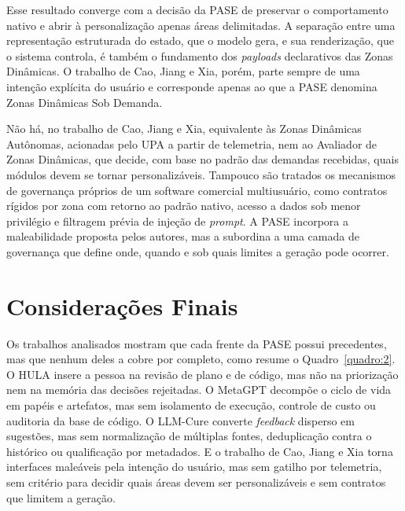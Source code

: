 Esse resultado converge com a decisão da PASE de preservar o comportamento nativo e abrir à personalização apenas áreas delimitadas. A separação entre uma representação estruturada do estado, que o modelo gera, e sua renderização, que o sistema controla, é também o fundamento dos \textit{payloads} declarativos das Zonas Dinâmicas. O trabalho de Cao, Jiang e Xia, porém, parte sempre de uma intenção explícita do usuário e corresponde apenas ao que a PASE denomina Zonas Dinâmicas Sob Demanda.

Não há, no trabalho de Cao, Jiang e Xia, equivalente às Zonas Dinâmicas Autônomas, acionadas pelo UPA a partir de telemetria, nem ao Avaliador de Zonas Dinâmicas, que decide, com base no padrão das demandas recebidas, quais módulos devem se tornar personalizáveis. Tampouco são tratados os mecanismos de governança próprios de um software comercial multiusuário, como contratos rígidos por zona com retorno ao padrão nativo, acesso a dados sob menor privilégio e filtragem prévia de injeção de \textit{prompt}. A PASE incorpora a maleabilidade proposta pelos autores, mas a subordina a uma camada de governança que define onde, quando e sob quais limites a geração pode ocorrer.

\section{Considerações Finais}\label{sec:3.6}

Os trabalhos analisados mostram que cada frente da PASE possui precedentes, mas que nenhum deles a cobre por completo, como resume o Quadro~\ref{quadro:2}. O HULA insere a pessoa na revisão de plano e de código, mas não na priorização nem na memória das decisões rejeitadas. O MetaGPT decompõe o ciclo de vida em papéis e artefatos, mas sem isolamento de execução, controle de custo ou auditoria da base de código. O LLM-Cure converte \textit{feedback} disperso em sugestões, mas sem normalização de múltiplas fontes, deduplicação contra o histórico ou qualificação por metadados. E o trabalho de Cao, Jiang e Xia torna interfaces maleáveis pela intenção do usuário, mas sem gatilho por telemetria, sem critério para decidir quais áreas devem ser personalizáveis e sem contratos que limitem a geração.

